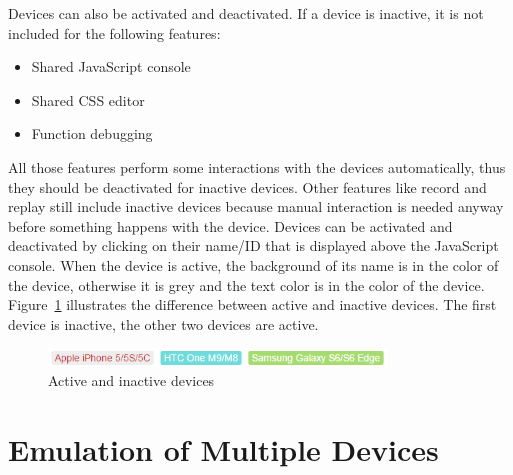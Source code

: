 Devices can also be activated and deactivated. If a device is inactive, it is not included for the following features:
\begin{itemize}
	\item Shared JavaScript console
	\item Shared CSS editor
	\item Function debugging
\end{itemize}
All those features perform some interactions with the devices automatically, thus they should be deactivated for inactive devices. Other features like record and replay still include inactive devices because manual interaction is needed anyway before something happens with the device. Devices can be activated and deactivated by clicking on their name/ID that is displayed above the JavaScript console. When the device is active, the background of its name is in the color of the device, otherwise it is grey and the text color is in the color of the device. Figure~\ref{fig:active_inactive} illustrates the difference between active and inactive devices. The first device is inactive, the other two devices are active.

\begin{figure}[H]
  \centering
    \includegraphics[width=0.8\textwidth]{images/screenshots/active_inactive.png}
	\caption[Screenshot: Active/inactive devices]{Active and inactive devices}
	\label{fig:active_inactive}
\end{figure}

\section{Emulation of Multiple Devices}

